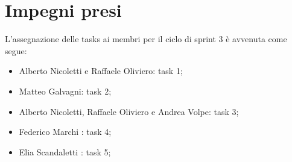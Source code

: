 \documentclass[a4paper, 12pt]{article}
\begin{document}
\section{Impegni presi}
L'assegnazione delle tasks ai membri per il ciclo di sprint 3 è avvenuta come segue:
\begin{itemize}
	\item Alberto Nicoletti e Raffaele Oliviero: task 1;
	\item Matteo Galvagni: task 2;
	\item Alberto Nicoletti, Raffaele Oliviero e Andrea Volpe: task 3;
	\item Federico Marchi : task 4;
	\item Elia Scandaletti : task 5;
\end{itemize}
\end{document}
